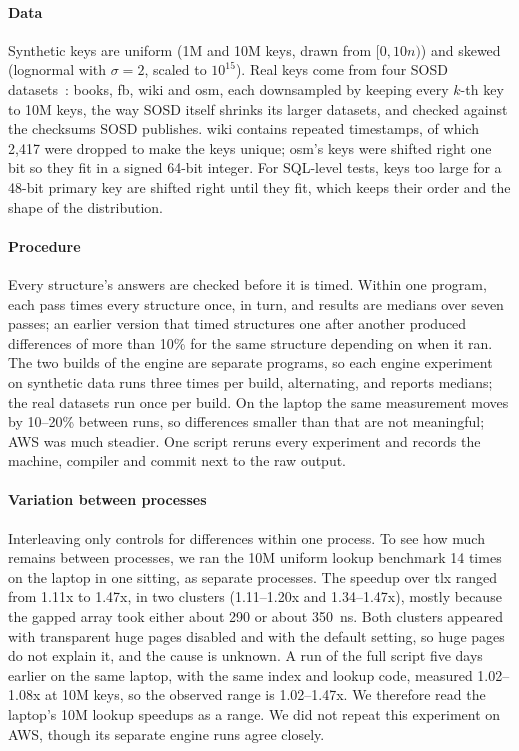 \documentclass[conference]{IEEEtran}
\begin{document}
\paragraph{Data} Synthetic keys are uniform (1M and 10M keys, drawn from
$[0, 10n)$) and skewed (lognormal with $\sigma = 2$, scaled to $10^{15}$).
Real keys come from four SOSD datasets~\cite{marcus2020}: books, fb, wiki
and osm, each downsampled by keeping every $k$-th key to 10M keys, the way
SOSD itself shrinks its larger datasets, and checked against the checksums
SOSD publishes. wiki contains repeated timestamps, of which 2,417 were
dropped to make the keys unique; osm's keys were shifted right one bit so
they fit in a signed 64-bit integer. For SQL-level tests, keys too large
for a 48-bit primary key are shifted right until they fit, which keeps
their order and the shape of the distribution.

\paragraph{Procedure} Every structure's answers are checked before it is
timed. Within one program, each pass times every structure once, in turn,
and results are medians over seven passes; an earlier version that timed
structures one after another produced differences of more than 10\% for
the same structure depending on when it ran. The two builds of the engine
are separate programs, so each engine experiment on synthetic data runs three
times per build, alternating, and reports medians; the real datasets run once
per build. On the laptop the same measurement moves
by 10--20\% between runs, so differences smaller than that are not
meaningful; AWS was much steadier. One script reruns every experiment and
records the machine, compiler and commit next to the raw output.

\paragraph{Variation between processes} Interleaving only controls for
differences within one process. To see how much remains between processes, we
ran the 10M uniform lookup benchmark 14 times on the laptop in one sitting, as
separate processes. The speedup over tlx ranged from 1.11x to 1.47x, in two
clusters (1.11--1.20x and 1.34--1.47x), mostly because the gapped array took
either about 290 or about 350~ns. Both clusters appeared with transparent huge
pages disabled and with the default setting, so huge pages do not explain it,
and the cause is unknown. A run of the full script five days earlier on the same
laptop, with the same index and lookup code, measured 1.02--1.08x at 10M keys, so
the observed range is 1.02--1.47x. We therefore read the laptop's 10M lookup
speedups as a range. We did not repeat
this experiment on AWS, though its separate engine runs agree closely.
\end{document}
